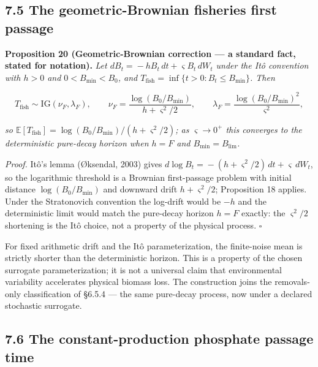 \documentclass[11pt]{article}
\begin{document}
\subsection*{7.5 The geometric-Brownian fisheries first passage}\label{75-the-geometric-brownian-fisheries-first-passage}

\textbf{Proposition 20 (Geometric-Brownian correction --- a standard fact, stated for notation).} \emph{Let \(dB_t =\allowbreak{} -hB_t\,\allowbreak{} dt +\allowbreak{} \varsigma B_t\,\allowbreak{} dW_t\) under the It\^{o} convention with \(h > 0\) and \(0 < B_{\min} < B_0\), and \(T_{\mathrm{fish}} =\allowbreak{} \inf\{ t > 0 : B_t \le B_{\min} \}\). Then} 

$$T_{\mathrm{fish}} \sim \mathrm{IG}(\nu_F, \lambda_F), \qquad \nu_F = \frac{\log(B_0/\allowbreak{}B_{\min})}{h + \varsigma^2/\allowbreak{}2}, \qquad \lambda_F = \frac{\log(B_0/\allowbreak{}B_{\min})^2}{\varsigma^2},$$

 \emph{so \(\mathbb{E}[T_{\mathrm{fish}}] =\allowbreak{} \log(B_0/\allowbreak{}B_{\min})/(h +\allowbreak{} \varsigma^2/\allowbreak{}2)\); as \(\varsigma \to 0^+\) this converges to the deterministic pure-decay horizon when \(h = F\) and \(B_{\min} = B_{\lim}\).}

\emph{Proof.} It\^{o}'s lemma (\O{}ksendal, 2003) gives \(d\log B_t =\allowbreak{} -(h +\allowbreak{} \varsigma^2/\allowbreak{}2)\,\allowbreak{} dt +\allowbreak{} \varsigma\,\allowbreak{} dW_t\), so the logarithmic threshold is a Brownian first-passage problem with initial distance \(\log(B_0/\allowbreak{}B_{\min})\) and downward drift \(h +\allowbreak{} \varsigma^2/\allowbreak{}2\); Proposition 18 applies. Under the Stratonovich convention the log-drift would be \(-h\) and the deterministic limit would match the pure-decay horizon \(h = F\) exactly: the \(\varsigma^2/\allowbreak{}2\) shortening is the It\^{o} choice, not a property of the physical process. \(\square\)

For fixed arithmetic drift and the It\^{o} parameterization, the finite-noise mean is strictly shorter than the deterministic horizon. This is a property of the chosen surrogate parameterization; it is not a universal claim that environmental variability accelerates physical biomass loss. The construction joins the removals-only classification of \S6.5.4 --- the same pure-decay process, now under a declared stochastic surrogate.

\subsection*{7.6 The constant-production phosphate passage time}\label{76-the-constant-production-phosphate-passage-time}
\end{document}
